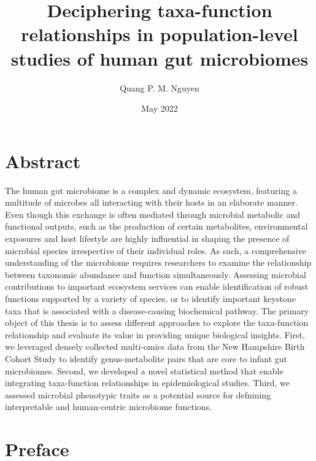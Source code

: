 \documentclass{dcthesis}
\title{Deciphering taxa-function relationships in population-level studies of human gut microbiomes}
\author{Quang P. M. Nguyen}
\date{May 2022}
\theoremstyle{definition}
\theoremstyle{remark}
\begin{document}
\frontmatter

\maketitle
\restoregeometry

\chapter*{Abstract}
The human gut microbiome is a complex and dynamic ecosystem, featuring a multitude of microbes all interacting with their hosts in an elaborate manner. Even though this exchange is often mediated through microbial metabolic and functional outputs, such as the production of certain metabolites, environmental exposures and host lifestyle are highly influential in shaping the presence of microbial species irrespective of their individual roles. As such, a comprehensive understanding of the microbiome requires researchers to examine the relationship between taxonomic abundance and function simultaneously. Assessing microbial contributions to important ecosystem services can enable identification of robust functions supported by a variety of species, or to identify important keystone taxa that is associated with a disease-causing biochemical pathway. The primary object of this thesis is to assess different approaches to explore the taxa-function relationship and evaluate its value in providing unique biological insights. First, we leveraged densely collected multi-omics data from the New Hampshire Birth Cohort Study to identify genus-metabolite pairs that are core to infant gut microbiomes. Second, we developed a novel statistical method that enable integrating taxa-function relationships in epidemiological studies. Third, we assessed microbial phenotypic traits as a potential source for defnining interpretable and human-centric microbiome functions. 

\chapter*{Preface}
\end{document}
